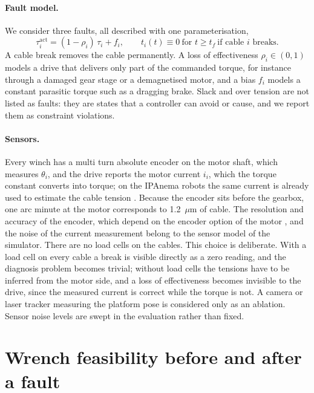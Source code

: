 \documentclass[10pt]{article}
\begin{document}
\paragraph{Fault model.} We consider three faults, all described with one parameterisation,
\begin{equation}\label{eq:fault}
\tau_i^{\mathrm{act}}=(1-\rho_i)\,\tau_i+f_i,\qquad t_i(t)\equiv0\ \text{for } t\ge t_{f}\ \text{if cable } i\text{ breaks}.
\end{equation}
A cable break removes the cable permanently. A loss of effectiveness $\rho_i\in(0,1)$ models a drive that delivers only part of the commanded torque, for instance through a damaged gear stage or a demagnetised motor, and a bias $f_i$ models a constant parasitic torque such as a dragging brake. Slack and over tension are not listed as faults: they are states that a controller can avoid or cause, and we report them as constraint violations.

\paragraph{Sensors.} Every winch has a multi turn absolute encoder on the motor shaft, which measures $\theta_i$, and the drive reports the motor current $i_i$, which the torque constant converts into torque; on the IPAnema robots the same current is already used to estimate the cable tension \citep{pott2013ipanema}. Because the encoder sits before the gearbox, one arc minute at the motor corresponds to 1.2~$\mu$m of cable. The resolution and accuracy of the encoder, which depend on the encoder option of the motor \citep{rexroth_msk2018}, and the noise of the current measurement belong to the sensor model of the simulator. There are no load cells on the cables. This choice is deliberate. With a load cell on every cable a break is visible directly as a zero reading, and the diagnosis problem becomes trivial; without load cells the tensions have to be inferred from the motor side, and a loss of effectiveness becomes invisible to the drive, since the measured current is correct while the torque is not. A camera or laser tracker measuring the platform pose is considered only as an ablation. Sensor noise levels are swept in the evaluation rather than fixed.

\section{Wrench feasibility before and after a fault}\label{sec:workspace}
\end{document}
